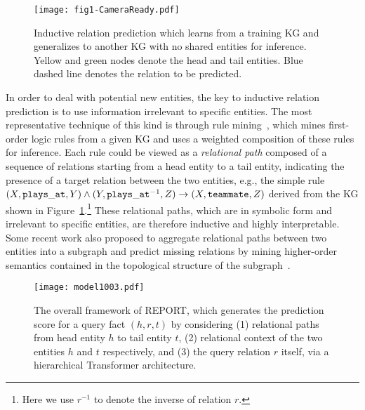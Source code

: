 \documentclass{article}
\begin{document}
\begin{figure}[t]
\centering
\texttt{[image: fig1-CameraReady.pdf]} %
\caption{Inductive relation prediction which learns from a training KG and generalizes to another KG with no shared entities for inference. Yellow and green nodes denote the head and tail entities. Blue dashed line denotes the relation to be predicted.}
\vspace{-0.2in}
\label{fig1}
\end{figure}

In order to deal with potential new entities, the key to inductive relation prediction is to use information irrelevant to specific entities. 
The most representative technique of this kind is through rule mining~\cite{neurallp,rulen,drum}, which mines first-order logic rules from a given KG and uses a weighted composition of these rules for inference. Each rule could be viewed as a \textit{relational path} composed of a sequence of relations starting from a head entity to a tail entity, indicating the presence of a target relation between the two entities, e.g., the simple rule $(X, {\small\tt plays\_at}, Y) \wedge(Y, {\small\tt plays\_at}^{-1}, Z) \rightarrow (X, {\small\tt teammate}, Z)$ derived from the KG shown in Figure~\ref{fig1}.\footnote{Here we use $r^{-1}$ to denote the inverse of relation $r$.} These relational paths, which are in symbolic form and irrelevant to specific entities, are therefore inductive and highly interpretable. Some recent work also proposed to aggregate relational paths between two entities into a subgraph and predict missing relations by mining higher-order semantics contained in the topological structure of the subgraph~\cite{grail,mai2021communicative,tact,conglr,kwak2022subgraph}.

\begin{figure*}[t]
\centering
\texttt{[image: model1003.pdf]} %
\caption{The overall framework of REPORT, which generates the prediction score for a query fact $(h,r,t)$ by considering (1) relational paths from head entity $h$ to tail entity $t$, (2) relational context of the two entities $h$ and $t$ respectively, and (3) the query relation $r$ itself, via a hierarchical Transformer architecture.}
\vspace{-0.2in}
\label{fig2}
\end{figure*}
\end{document}

